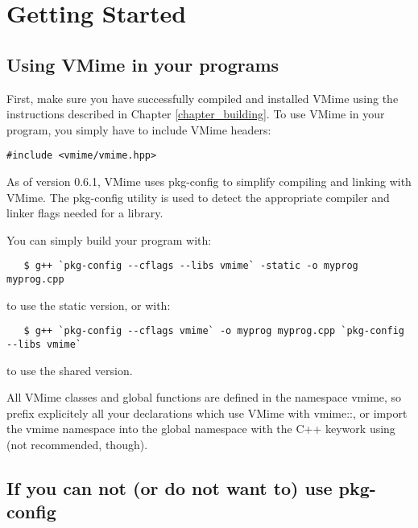 \chapter{Getting Started}

\section{Using VMime in your programs}

First, make sure you have successfully compiled and installed VMime using the
instructions described in Chapter \ref{chapter_building}. To use VMime in your
program, you simply have to include VMime headers:

\begin{lstlisting}
#include <vmime/vmime.hpp>
\end{lstlisting}


As of version 0.6.1, VMime uses {\vcode pkg-config} to simplify compiling and
linking with VMime. The {\vcode pkg-config} utility is used to detect the
appropriate compiler and linker flags needed for a library.

You can simply build your program with:

\begin{verbatim}
   $ g++ `pkg-config --cflags --libs vmime` -static -o myprog myprog.cpp
\end{verbatim}

to use the static version, or with:

\begin{verbatim}
   $ g++ `pkg-config --cflags vmime` -o myprog myprog.cpp `pkg-config --libs vmime`
\end{verbatim}

to use the shared version.


All VMime classes and global functions are defined in the namespace
{\vcode vmime}, so prefix explicitely all your declarations which use VMime
with {\vcode vmime::}, or import the {\vcode vmime} namespace into the global
namespace with the C++ keywork {\vcode using} (not recommended, though).


\section{If you can not (or do not want to) use {\vcode pkg-config}}

